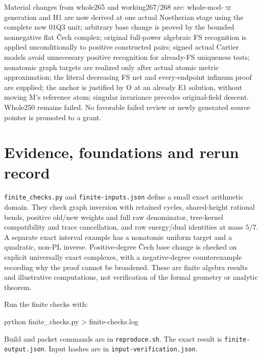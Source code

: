 \documentclass[
  11pt,
]{article}
\newenvironment{Shaded}{}{}
\newcommand{\ExtensionTok}[1]{#1}
\newcommand{\NormalTok}[1]{#1}
\newcommand{\OperatorTok}[1]{\textcolor[rgb]{0.40,0.40,0.40}{#1}}
\begin{document}
Material changes from whole265 and working267/268 are:
whole-mod-\(\varpi\) generation and H1 are now derived at one actual
Noetherian stage using the complete new 01Q3 unit; arbitrary base change
is proved by the bounded nonnegative flat Čech complex; original
full-power algebraic FS recognition is applied unconditionally to
positive constructed pairs; signed actual Cartier models avoid
unnecessary positive recognition for already-FS uniqueness tests;
nonatomic graph targets are realized only after actual atomic metric
approximation; the literal decreasing FS net and every-endpoint infimum
proof are supplied; the anchor is justified by O at an already E1
solution, without moving M's reference atom; singular invariance
precedes original-field descent. Whole250 remains failed. No favorable
failed review or newly generated source pointer is promoted to a grant.

\section{Evidence, foundations and rerun
record}\label{evidence-foundations-and-rerun-record}

\texttt{finite\_checks.py} and \texttt{finite-inputs.json} define a
small exact arithmetic domain. They check graph inversion with retained
cycles, shared-height rational bends, positive old/new weights and full
raw denominator, tree-kernel compatibility and trace cancellation, and
raw energy/dual identities at mass \(5/7\). A separate exact interval
example has a nonatomic uniform target and a quadratic, non-PL inverse.
Positive-degree Čech base change is checked on explicit universally
exact complexes, with a negative-degree counterexample recording why the
proof cannot be broadened. These are finite algebra results and
illustrative computations, not verification of the formal geometry or
analytic theorem.

Run the finite checks with:

\begin{Shaded}
\begin{Highlighting}[]
\ExtensionTok{python}\NormalTok{ finite\_checks.py }\OperatorTok{\textgreater{}}\NormalTok{ finite{-}checks.log}
\end{Highlighting}
\end{Shaded}

Build and packet commands are in \texttt{reproduce.sh}. The exact result
is \texttt{finite-output.json}. Input hashes are in
\texttt{input-verification.json}.
\end{document}
